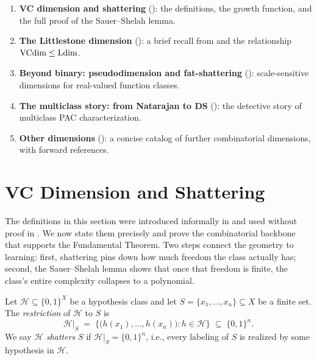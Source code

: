 \begin{enumerate}[leftmargin=*,itemsep=2pt]
\item \textbf{VC dimension and shattering} (): the
  definitions, the growth function, and the full proof of the Sauer--Shelah
  lemma.
\item \textbf{The Littlestone dimension} (): a brief
  recall from  and the relationship $\mathrm{VCdim} \leq \mathrm{Ldim}$.
\item \textbf{Beyond binary: pseudodimension and fat-shattering}
  (): scale-sensitive dimensions for real-valued
  function classes.
\item \textbf{The multiclass story: from Natarajan to DS}
  (): the detective story of multiclass PAC
  characterization.
\item \textbf{Other dimensions} (): a concise catalog of
  further combinatorial dimensions, with forward references.
\end{enumerate}



\section{VC Dimension and Shattering}
\label{sec:vc-dim}

The definitions in this section were introduced informally in 
and used without proof in .  We now state them precisely and prove
the combinatorial backbone that supports the Fundamental Theorem.  Two steps
connect the geometry to learning: first, shattering pins down how much freedom
the class actually has; second, the Sauer--Shelah lemma shows that once that
freedom is finite, the class's entire complexity collapses to a polynomial.

\begin{defn}
\label{def:shattering}
Let $\mathcal{H} \subseteq \{0,1\}^X$ be a hypothesis class and let
$S = \{x_1, \ldots, x_n\} \subseteq X$ be a finite set.  The
\emph{restriction} of $\mathcal{H}$ to $S$ is
\[
  \mathcal{H}|_S \;=\; \bigl\{\bigl(h(x_1), \ldots, h(x_n)\bigr) : h \in \mathcal{H}\bigr\}
  \;\subseteq\; \{0,1\}^n.
\]
We say $\mathcal{H}$ \emph{shatters} $S$ if $\mathcal{H}|_S = \{0,1\}^n$,
i.e., every labeling of $S$ is realized by some hypothesis in $\mathcal{H}$.
\end{defn}

